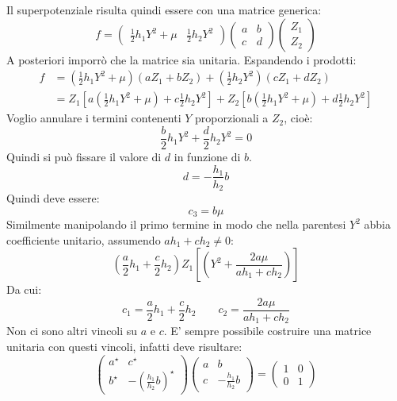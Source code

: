 \documentclass[]{scrartcl}
\begin{document}
Il superpotenziale risulta quindi essere con una matrice generica:
\[
  f =
  \begin{pmatrix}
    \frac{1}{2}h_1 Y^2 + \mu        &
    \frac{1}{2}h_2 Y^2
  \end{pmatrix}
  \begin{pmatrix}
    a                               & b                    \\
    c                               & d
  \end{pmatrix}
  \begin{pmatrix}
    Z_1                                                     \\
    Z_2
  \end{pmatrix}
\]
A posteriori imporrò che la matrice sia unitaria. Espandendo i prodotti:
\begin{align*}
  f  & =  \left(\frac{1}{2} h_1 Y^2 + \mu\right)(a Z_1 + b Z_2) + \left(\frac{1}{2} h_2  Y^2\right)(c Z_1 + d Z_2) \\
     & = Z_1 \left[ a \left( \frac{1}{2} h_1 Y^2 + \mu \right) + c  \frac{1}{2} h_2 Y^2  \right] +
       Z_2 \left[ b \left( \frac{1}{2} h_1 Y^2 + \mu \right) + d  \frac{1}{2} h_2 Y^2  \right]
\end{align*}
Voglio annulare i termini contenenti $ Y $ proporzionali a $ Z_2 $, cioè:
\[
  \frac{b}{2}h_1 Y^2 + \frac{d}{2}h_2 Y^2 = 0
\]
Quindi si può fissare il valore di $ d $ in funzione di $ b $.
\[
  d = -\frac{h_1}{h_2}b
\]
Quindi deve essere:
\[
  c_3 = b \mu
\]
Similmente manipolando il primo termine in modo che nella parentesi $ Y^2 $ abbia coefficiente unitario, assumendo $ a h_1 + c h_2 \not = 0 $:
\[
  \left( \frac{a}{2} h_1 + \frac{c}{2} h_2 \right) Z_1 \left[ \left( Y^2 + \frac{2a\mu}{a h_1 + c h_2} \right) \right]
\]
Da cui:
\[
  c_1 = \frac{a}{2} h_1 + \frac{c}{2} h_2 \qquad c_2 =  \frac{2a\mu}{a h_1 + c h_2}
\]
Non ci sono altri vincoli su $ a \text{ e } c $. %
E' sempre  possibile costruire una matrice unitaria con questi vincoli, infatti deve risultare:
\[
  \begin{pmatrix}
    a^\star & c^\star \\
    b^\star & -\left(\frac{h_1}{h_2}b\right)^\star
  \end{pmatrix}
  \begin{pmatrix}
    a       & b       \\
    c       & -\frac{h_1}{h_2}b
  \end{pmatrix}
  =
  \begin{pmatrix}
    1       & 0       \\
    0       & 1
  \end{pmatrix}
\]
\end{document}
